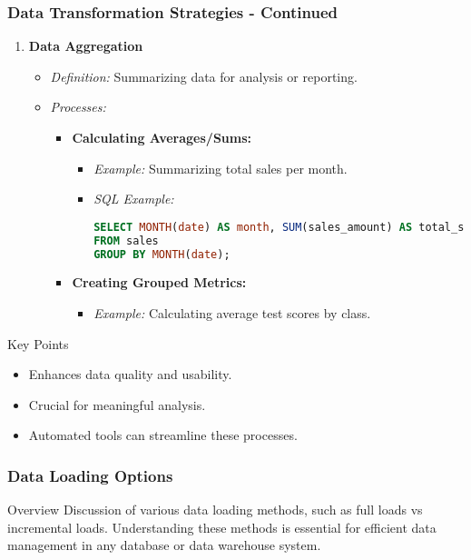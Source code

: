 \documentclass[aspectratio=169]{beamer}
\begin{document}
\begin{frame}[fragile]
    \frametitle{Data Transformation Strategies - Continued}
    \begin{enumerate}[resume]
        \item \textbf{Data Aggregation}
        \begin{itemize}
            \item \textit{Definition:} Summarizing data for analysis or reporting.
            \item \textit{Processes:}
            \begin{itemize}
                \item \textbf{Calculating Averages/Sums:}
                \begin{itemize}
                    \item \textit{Example:} Summarizing total sales per month.
                    \item \textit{SQL Example:}
                    \begin{lstlisting}[language=SQL]
SELECT MONTH(date) AS month, SUM(sales_amount) AS total_sales
FROM sales
GROUP BY MONTH(date);
                    \end{lstlisting}
                \end{itemize}
                \item \textbf{Creating Grouped Metrics:}
                \begin{itemize}
                    \item \textit{Example:} Calculating average test scores by class.
                \end{itemize}
            \end{itemize}
        \end{itemize}
    \end{enumerate}
    \begin{block}{Key Points}
        \begin{itemize}
            \item Enhances data quality and usability.
            \item Crucial for meaningful analysis.
            \item Automated tools can streamline these processes.
        \end{itemize}
    \end{block}
\end{frame}

\begin{frame}[fragile]
    \frametitle{Data Loading Options}
    \begin{block}{Overview}
        Discussion of various data loading methods, such as full loads vs incremental loads. Understanding these methods is essential for efficient data management in any database or data warehouse system.
    \end{block}
\end{frame}
\end{document}
